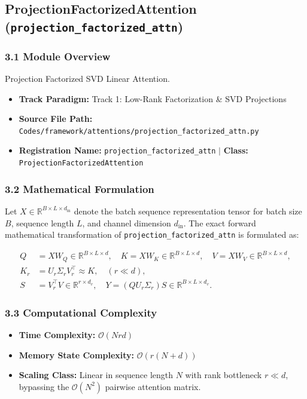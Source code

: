 \subsection{ProjectionFactorizedAttention (\texttt{projection\_factorized\_attn})}
\label{sec:app_module_projection_factorized_attn}

\subsubsection*{3.1 Module Overview}
Projection Factorized SVD Linear Attention.
\begin{itemize}
    \item \textbf{Track Paradigm:} Track 1: Low-Rank Factorization \& SVD Projections
    \item \textbf{Source File Path:} \texttt{Codes/framework/attentions/projection\_factorized\_attn.py}
    \item \textbf{Registration Name:} \texttt{projection\_factorized\_attn} $\mid$ \textbf{Class:} \texttt{ProjectionFactorizedAttention}
\end{itemize}

\subsubsection*{3.2 Mathematical Formulation}
Let $X \in \mathbb{R}^{B \times L \times d_{\text{in}}}$ denote the batch sequence representation tensor for batch size $B$, sequence length $L$, and channel dimension $d_{\text{in}}$. The exact forward mathematical transformation of \texttt{projection\_factorized\_attn} is formulated as:

\begin{align}
Q &= X W_Q \in \mathbb{R}^{B \times L \times d}, \quad K = X W_K \in \mathbb{R}^{B \times L \times d}, \quad V = X W_V \in \mathbb{R}^{B \times L \times d}, \\
K_r &= U_r \Sigma_r V_r^\top \approx K, \quad (r \ll d), \\
S &= V_r^\top V \in \mathbb{R}^{r \times d_v}, \quad Y = (Q U_r \Sigma_r) S \in \mathbb{R}^{B \times L \times d_v}.
\end{align}


\subsubsection*{3.3 Computational Complexity}
\begin{itemize}
    \item \textbf{Time Complexity:} $\mathcal{O}(N r d)$
    \item \textbf{Memory State Complexity:} $\mathcal{O}(r(N + d))$
    \item \textbf{Scaling Class:} Linear in sequence length $N$ with rank bottleneck $r \ll d$, bypassing the $\mathcal{O}(N^2)$ pairwise attention matrix.
\end{itemize}

